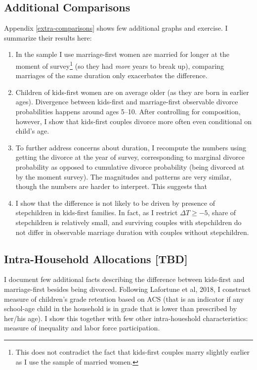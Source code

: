 \documentclass[12pt,letter]{article}
\begin{document}
\subsection{Additional Comparisons}

Appendix \ref{extra-comparisons} shows few additional graphs and exercise. I summarize their results here:
\begin{enumerate}
\item In the sample I use marriage-first women are married for longer at the moment of survey\footnote{This does not contradict the fact that kids-first couples marry slightly earlier as I use the sample of married women.} (so they had \emph{more} years to break up), comparing marriages of the same duration only exacerbates the difference.
\item Children of kids-first women are on average older (as they are born in earlier ages). Divergence between kids-first and marriage-first observable divorce probabilities happens around ages 5--10. After controlling for composition, however, I show that kids-first couples divorce more often even conditional on child's age.
\item To further address concerns about duration, I recompute the numbers using getting the divorce at the year of survey, corresponding to marginal divorce probability as opposed to cumulative divorce probability (being divorced at by the moment survey). The magnitudes and patterns are very similar, though the numbers are harder to interpret. This suggests that 
\item I show that the difference is not likely to be driven by presence of stepchildren in kids-first families. In fact, as I restrict $\Delta T \geq -5$, share of stepchildren is relatively small, and surviving couples with stepchildren do not differ in observable marriage duration with couples without stepchildren.
\end{enumerate}

\subsection{Intra-Household Allocations [TBD]}
I document few additional facts describing the difference between kids-first and marriage-first besides being divorced. Following Lafortune et al, 2018, I construct measure of children's grade retention based on ACS (that is an indicator if any school-age child in the household is in grade that is lower than prescribed by her/his age). I show this together with few other intra-houeshold characteristics: measure of inequality and labor force participation. 
\end{document}
